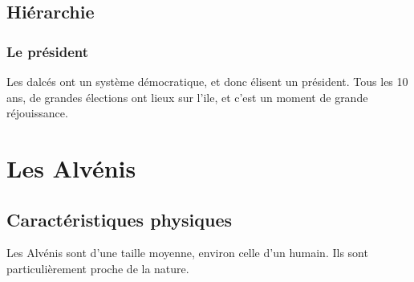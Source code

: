 \subsection{Hiérarchie}
\subsubsection{Le président}
Les dalcés ont un système démocratique, et donc élisent un président. Tous les 10 ans, de grandes élections ont lieux sur l'ile, et c'est un moment de grande réjouissance.

\section{Les Alvénis}
\subsection{Caractéristiques physiques}
Les Alvénis sont d'une taille moyenne, environ celle d'un humain. Ils sont particulièrement proche de la nature.